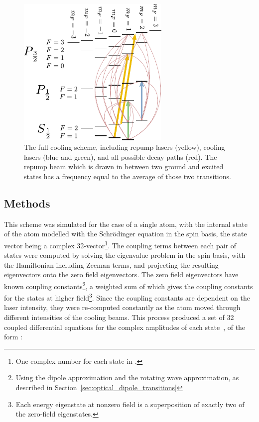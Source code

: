 \begin{figure}
\begin{center}
\includegraphics[width=0.65\textwidth]{figures/unsorted/cooling_full.pdf}
\caption{\label{fig:cooling_full} The full cooling scheme, including repump lasers (yellow), cooling lasers (blue and green), and all possible decay paths (red). The repump beam which is drawn in between two ground and excited states has a frequency equal to the average of those two transitions. }
\end{center}
\end{figure}

\subsection{Methods}

This scheme was simulated for the case of a single atom, with the internal state of the atom modelled with the Schr\"odinger equation in the spin basis, the state vector being a complex 32-vector\footnote{One complex number for each state in .}. The coupling terms between each pair of states were computed by solving the eigenvalue problem in the spin basis, with the Hamiltonian including Zeeman terms, and projecting the resulting eigenvectors onto the zero field eigenvectors. The zero field eigenvectors have known coupling constants\footnote{Using the dipole approximation and the rotating wave approximation, as described in Section~\ref{sec:optical_dipole_transitions}}, a weighted sum of which gives the coupling constants for the states at higher field\footnote{Each energy eigenstate at nonzero field is a superposition of exactly two of the zero-field eigenstates.}. Since the coupling constants are dependent on the laser intensity, they were re-computed constantly as the atom moved through different intensities of the cooling beams. This process produced a set of 32 coupled differential equations for the complex amplitudes of each state~\cite[p 4]{metcalf_laser_1999}, of the form :

